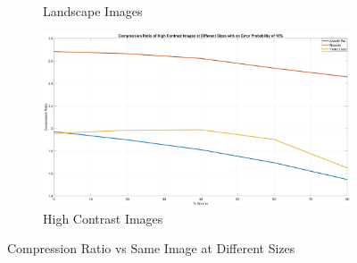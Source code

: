 \documentclass[landscape,a0paper,fontscale=0.5]{baposter} %
\begin{document}
\begin{poster}
{\begin{figure}[H]
\begin{subfigure}{0.3\textwidth}
		\caption{Landscape Images} %
	\end{subfigure}
	\begin{subfigure}{0.3\textwidth} %
		\includegraphics[scale=0.07]{HighContrastGraph}
		\caption{High Contrast Images} %
	\end{subfigure}
	\vspace{-2em}
	\caption{Compression Ratio vs Same Image at Different Sizes}
	\label{fig: CR} %
\end{figure}

}
\end{poster}
\end{document}
